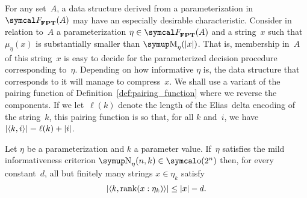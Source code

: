 For any set~$A$, a data structure derived from a parameterization in~$\calF_\cl{FPT}(A)$ may have an especially desirable characteristic.
Consider in relation to~$A$ a parameterization $\eta \in \calF_\cl{FPT}(A)$ and a string~$x$ such that $\mu_\eta(x)$ is substantially smaller than $\upM_\eta(\length{x})$.
That is, membership in~$A$ of this string~$x$ is easy to decide for the parameterized decision procedure corresponding to~$\eta$.
Depending on how informative $\eta$ is, the data structure that corresponds to it will manage to compress~$x$.
We shall use a variant of the pairing function of Definition~\ref{def:pairing_function} where we reverse the components.
If we let~$\ell(k)$ denote the length of the Elias~delta encoding of the string~$k$, this pairing function is so that, for all $k$ and~$i$, we have ${\lvert{\langle k, i\rangle}\rvert} = \ell(k) + {\lvert i\rvert}$.
\begin{theorem}
\label{thm:easycompressible}%
  Let $\eta$ be a parameterization and $k$ a parameter value.
  If~$\eta$ satisfies the mild informativeness criterion $\upN_\eta(n, k) \in \littleo(2^n)$ then, for every constant~$d$, all but finitely many strings $x \in \eta_k$ satisfy
  \begin{equation*}
    {\lvert{\langle k, \operatorname{rank}(x : \eta_k)\rangle}\rvert} \le {\lvert x\rvert} - d.
  \end{equation*}
\end{theorem}
